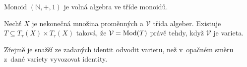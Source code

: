 \begin{example}
    Monoid $(\mathbb{N}, +, 1)$ je volná algebra ve tříde monoidů.
\end{example}

\begin{theorem}[Birkhoff]
    Nechť $X$ je nekonečná množina proměnných
    a $\mathcal{V}$ třída algeber.
    Existuje
    $T \subseteq T_\tau(X) \times T_\tau(X)$
    taková, že $\mathcal{V} = \operatorname{Mod}(T)$
    právě tehdy,
    když $\mathcal{V}$ je varieta.
\end{theorem}

Zřejmě je snažší ze zadaných identit odvodit varietu, než v~opačném
směru z~dané variety vyvozovat identity.
